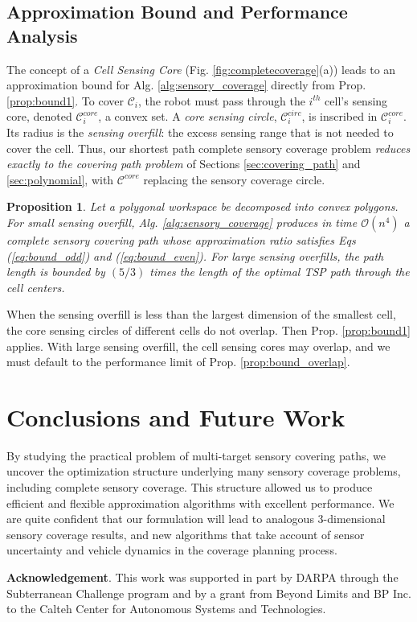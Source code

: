 \documentclass[letterpaper, 10 pt, conference]{ieeeconf}
\newtheorem{prop}[theorem]{Proposition}
\theoremstyle{definition}
\newcommand{\Cs}{\mathcal{C}}
\newcommand{\Os}{\mathcal{O}}
\begin{document}
\subsection{Approximation Bound and Performance Analysis}

\noindent The concept of a {\em Cell Sensing Core} (Fig. \ref{fig:completecoverage}(a)) leads to an approximation bound for Alg. \ref{alg:sensory_coverage} directly from Prop. \ref{prop:bound1}.  To cover $\Cs_i$, the robot must pass through the $i^{th}$ cell's sensing core, denoted $\Cs^{core}_i$, a convex set. A {\em core sensing circle}, $\Cs^{circ}_i$, is inscribed in $\Cs^{core}_i$. Its radius is the {\em sensing overfill}: the excess sensing range that is not needed to cover the cell.  Thus, our shortest path complete sensory coverage problem {\em reduces exactly to the covering path problem} of Sections \ref{sec:covering_path} and \ref{sec:polynomial}, with $\Cs^{core}$ replacing the sensory coverage circle.  

\begin{prop} \label{prop:final}
Let a polygonal workspace be decomposed into convex polygons.  For small sensing overfill, Alg. \ref{alg:sensory_coverage} produces in time $\Os(n^4)$ a complete sensory covering path whose approximation ratio satisfies Eqs (\ref{eq:bound_odd}) and (\ref{eq:bound_even}).  For large sensing overfills, the path length is bounded by $(5/3)$ times the length of the optimal TSP path through the cell centers.
\end{prop}
 When the sensing overfill is less than the largest dimension of the smallest cell, the core sensing circles of different cells do not overlap. Then Prop. \ref{prop:bound1} applies.  With large sensing overfill, the cell sensing cores may overlap, and we must default to the performance limit of Prop. \ref{prop:bound_overlap}.

\section{Conclusions and Future Work} \label{sec:conclusions}

\noindent By studying the practical problem of multi-target sensory covering paths, we uncover the optimization structure underlying many sensory coverage problems, including complete sensory coverage.  This structure allowed us to produce efficient and flexible approximation algorithms with excellent performance. We are quite confident that our formulation will lead to analogous 3-dimensional sensory coverage results, and new algorithms that take account of sensor uncertainty and vehicle dynamics in the coverage planning process.

{\bf Acknowledgement}. This work was supported in part by DARPA through the Subterranean Challenge program and by a grant from Beyond Limits and BP Inc. to the Calteh Center for Autonomous Systems and Technologies.



%
\end{document}
